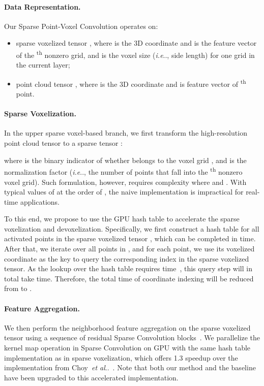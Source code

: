 \documentclass[runningheads]{llncs}
\makeatletter
\DeclareRobustCommand\onedot{\futurelet\@let@token\@onedot}
\def\@onedot{\ifx\@let@token.\else.\null\fi\xspace}
\def\ie{\emph{i.e}\onedot} \def\Ie{\emph{I.e}\onedot}
\def\etal{\emph{et al}\onedot}
\def\module{Sparse Point-Voxel Convolution\xspace}
\makeatother
\begin{document}
\paragraph{Data Representation.}

Our \module operates on:
\begin{itemize}
     \item sparse voxelized tensor , where  is the 3D coordinate and  is the feature vector of the \textsuperscript{th} nonzero grid, and  is the voxel size (\ie, side length) for one grid in the current layer;
     \item point cloud tensor , where  is the 3D coordinate and  is feature vector of \textsuperscript{th} point.
\end{itemize}

\paragraph{Sparse Voxelization.}

In the upper sparse voxel-based branch, we first transform the high-resolution point cloud tensor  to a sparse tensor :

where  is the binary indicator of whether  belongs to the voxel grid , and  is the normalization factor (\ie, the number of points that fall into the \textsuperscript{th} nonzero voxel grid). Such formulation, however, requires  complexity where  and . With typical values of  at the order of , the naive implementation is impractical for real-time applications.

To this end, we propose to use the GPU hash table to accelerate the sparse voxelization and devoxelization. Specifically, we first construct a hash table for all activated points in the sparse voxelized tensor , which can be completed in  time. After that, we iterate over all points in , and for each point, we use its voxelized coordinate as the key to query the corresponding index in the sparse voxelized tensor. As the lookup over the hash table requires  time~\cite{pagh2001cuckoo}, this query step will in total take  time. Therefore, the total time of coordinate indexing will be reduced from  to . 

\paragraph{Feature Aggregation.}

We then perform the neighborhood feature aggregation on the sparse voxelized tensor using a sequence of residual Sparse Convolution blocks~\cite{choy20194d}. We parallelize the kernel map operation in Sparse Convolution on GPU with the same hash table implementation as in sparse voxelization, which offers 1.3 speedup over the implementation from Choy~\etal~\cite{choy20194d}. Note that both our method and the baseline have been upgraded to this accelerated implementation.
\end{document}
